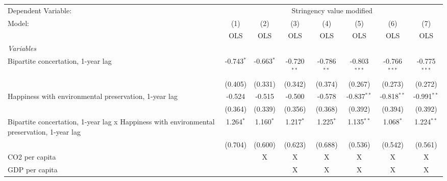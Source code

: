 
\begingroup
\centering
\begin{tabular}{lccccccc}
   \toprule
   Dependent Variable: & \multicolumn{7}{c}{Stringency value modified}\\
   Model:                                                                                     & (1)          & (2)          & (3)           & (4)           & (5)            & (6)            & (7)\\  
                                                                                              &  OLS         & OLS          & OLS           & OLS           & OLS            & OLS            & OLS\\  
   \midrule
   \emph{Variables}\\
   Bipartite concertation, 1-year lag                                                         & -0.743$^{*}$ & -0.663$^{*}$ & -0.720$^{**}$ & -0.786$^{**}$ & -0.803$^{***}$ & -0.766$^{***}$ & -0.775$^{***}$\\   
                                                                                              & (0.405)      & (0.331)      & (0.342)       & (0.374)       & (0.267)        & (0.273)        & (0.272)\\   
   Happiness with environmental preservation, 1-year lag                                      & -0.524       & -0.515       & -0.500        & -0.578        & -0.837$^{**}$  & -0.818$^{**}$  & -0.991$^{**}$\\   
                                                                                              & (0.364)      & (0.339)      & (0.356)       & (0.368)       & (0.392)        & (0.394)        & (0.392)\\   
   Bipartite concertation, 1-year lag x Happiness with environmental preservation, 1-year lag & 1.264$^{*}$  & 1.160$^{*}$  & 1.217$^{*}$   & 1.225$^{*}$   & 1.135$^{**}$   & 1.068$^{*}$    & 1.224$^{**}$\\   
                                                                                              & (0.704)      & (0.600)      & (0.623)       & (0.688)       & (0.536)        & (0.542)        & (0.561)\\   
   CO2 per capita                                                                             &              & X            & X             & X             & X              & X              & X\\  
   GDP per capita                                                                             &              &              & X             & X             & X              & X              & X\\  

\end{tabular}

